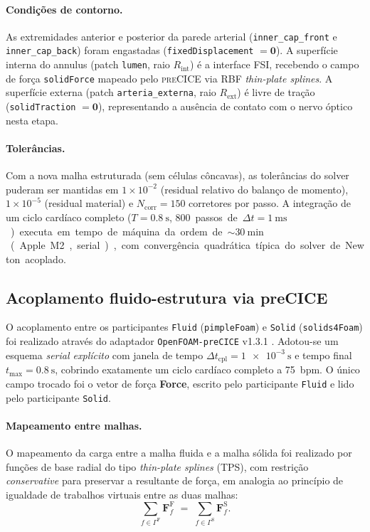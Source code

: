 \paragraph{Condições de contorno.}
As extremidades anterior e posterior da parede arterial
(\texttt{inner\_cap\_front} e \texttt{inner\_cap\_back}) foram engastadas
(\texttt{fixedDisplacement} \(= \mathbf{0}\)). A superfície interna do annulus
(patch \texttt{lumen}, raio \(R_{\mathrm{int}}\)) é a interface FSI,
recebendo o campo de força \texttt{solidForce} mapeado pelo \textsc{preCICE}
via RBF \emph{thin-plate splines}. A superfície externa
(patch \texttt{arteria\_externa}, raio \(R_{\mathrm{ext}}\)) é livre de
tração (\texttt{solidTraction} \(= \mathbf{0}\)), representando a ausência
de contato com o nervo óptico nesta etapa.

\paragraph{Tolerâncias.}
Com a nova malha estruturada (sem células côncavas), as tolerâncias do
solver puderam ser mantidas em \(1\times 10^{-2}\) (residual relativo do
balanço de momento), \(1\times 10^{-5}\) (residual material) e
\(N_{\mathrm{corr}} = 150\) corretores por passo. A integração de um ciclo
cardíaco completo (\(T = \SI{0,8}{\second}\), \SI{800} passos de \(\Delta t = \SI{1}{\milli\second}\))
executa em tempo de máquina da ordem de \(\sim\!\SI{30}{\minute}\) (Apple M2,
serial), com convergência quadrática típica do solver de Newton acoplado.

\subsection{Acoplamento fluido-estrutura via preCICE}
\label{sec:metodologia-fsi}

O acoplamento entre os participantes \texttt{Fluid} (\texttt{pimpleFoam}) e
\texttt{Solid} (\texttt{solids4Foam}) foi realizado através do adaptador
\texttt{OpenFOAM-preCICE} v1.3.1 \citep{Chourdakis2022}. Adotou-se um
esquema \emph{serial explícito} com janela de tempo
\(\Delta t_{\mathrm{cpl}} = \SI{1e-3}{\second}\) e tempo final
\(t_{\max} = \SI{0,8}{\second}\), cobrindo exatamente um ciclo cardíaco
completo a \SI{75}{bpm}. O único campo trocado foi o vetor de força
\textbf{Force}, escrito pelo participante \texttt{Fluid} e lido pelo
participante \texttt{Solid}.

\paragraph{Mapeamento entre malhas.}
O mapeamento da carga entre a malha fluida e a malha sólida foi realizado
por funções de base radial do tipo \emph{thin-plate splines} (TPS), com
restrição \emph{conservative} para preservar a resultante de força, em
analogia ao princípio de igualdade de trabalhos virtuais entre as duas
malhas:
\begin{equation}
  \sum_{f \in \Gamma^{\mathrm{F}}} \mathbf{F}^{\mathrm{F}}_f
  \;=\;
  \sum_{f \in \Gamma^{\mathrm{S}}} \mathbf{F}^{\mathrm{S}}_f.
  \label{eq:conservative}
\end{equation}

